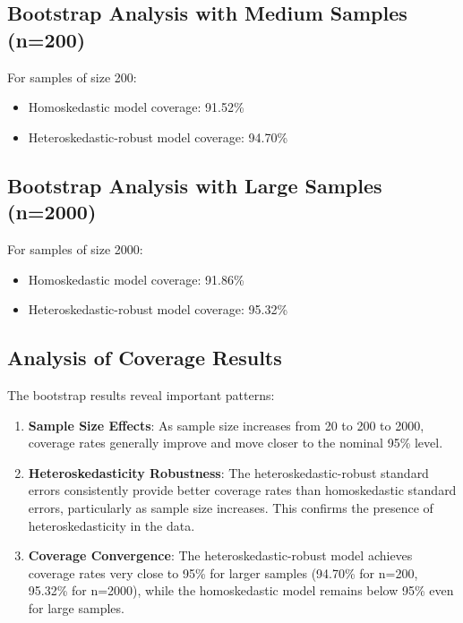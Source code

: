 \documentclass[12pt]{article}
\begin{document}
\subsection{Bootstrap Analysis with Medium Samples (n=200)}

For samples of size 200:
\begin{itemize}
    \item Homoskedastic model coverage: 91.52\%
    \item Heteroskedastic-robust model coverage: 94.70\%
\end{itemize}

\subsection{Bootstrap Analysis with Large Samples (n=2000)}

For samples of size 2000:
\begin{itemize}
    \item Homoskedastic model coverage: 91.86\%
    \item Heteroskedastic-robust model coverage: 95.32\%
\end{itemize}

\subsection{Analysis of Coverage Results}

The bootstrap results reveal important patterns:

\begin{enumerate}
    \item \textbf{Sample Size Effects}: As sample size increases from 20 to 200 to 2000, coverage rates generally improve and move closer to the nominal 95\% level.
    
    \item \textbf{Heteroskedasticity Robustness}: The heteroskedastic-robust standard errors consistently provide better coverage rates than homoskedastic standard errors, particularly as sample size increases. This confirms the presence of heteroskedasticity in the data.
    
    \item \textbf{Coverage Convergence}: The heteroskedastic-robust model achieves coverage rates very close to 95\% for larger samples (94.70\% for n=200, 95.32\% for n=2000), while the homoskedastic model remains below 95\% even for large samples.
\end{enumerate}
\end{document}
